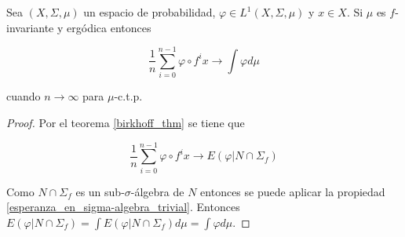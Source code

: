 \begin{corolario}\label{birkhoff_corolario}
	Sea $(X,\Sigma,\mu)$ un espacio de probabilidad, $\varphi \in L^1(X,\Sigma,\mu)$ y $x \in X$. Si $\mu$ es $f$-invariante y ergódica entonces
	
	\begin{equation}
		\frac{1}{n} \sum_{i=0}^{n-1} \varphi \circ f^i x \rightarrow \int \varphi d\mu
	\end{equation}
	
	cuando $n \rightarrow \infty$ para $\mu$-c.t.p.
\end{corolario}

\begin{proof}
	Por el teorema \ref{birkhoff_thm} se tiene que
	
	\begin{equation}
		\frac{1}{n} \sum_{i=0}^{n-1} \varphi \circ f^i x \rightarrow E(\varphi|N \cap \Sigma_f)
	\end{equation}
	
	Como $N \cap \Sigma_f$ es un sub-$\sigma$-álgebra de $N$ entonces se puede aplicar la propiedad \ref{esperanza_en_sigma-algebra_trivial}. Entonces $E(\varphi|N \cap \Sigma_f) = \int E(\varphi|N \cap \Sigma_f) d\mu = \int \varphi d\mu$. 
\end{proof}